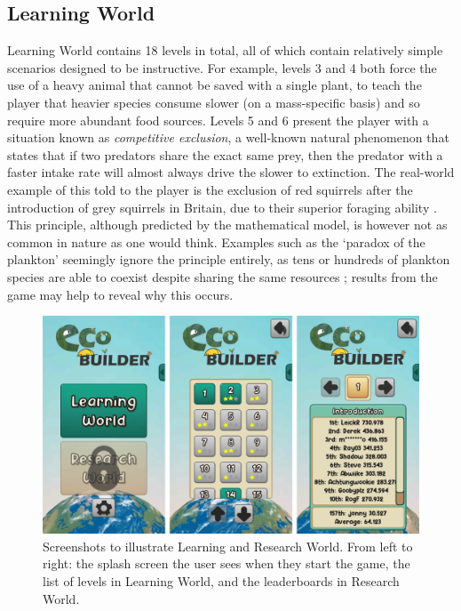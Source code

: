 \subsection{Learning World}
\label{sec:learning_world}
Learning World contains 18 levels in total, all of which contain relatively simple scenarios designed to be instructive. For example, levels 3 and 4 both force the use of a heavy animal that cannot be saved with a single plant, to teach the player that heavier species consume slower (on a mass-specific basis) and so require more abundant food sources. Levels 5 and 6 present the player with a situation known as \emph{competitive exclusion}, a well-known natural phenomenon that states that if two predators share the exact same prey, then the predator with a faster intake rate will almost always drive the slower to extinction.
The real-world example of this told to the player is the exclusion of red squirrels after the introduction of grey squirrels in Britain, due to their superior foraging ability \cite{Gurnell2004}.
This principle, although predicted by the mathematical model, is however not as common in nature as one would think. Examples such as the `paradox of the plankton' seemingly ignore the principle entirely, as tens or hundreds of plankton species are able to coexist despite sharing the same resources \cite{Hutchinson1961}; results from the game may help to reveal why this occurs.

\begin{figure}
    \centering
    \includegraphics[width=\textwidth]{joy/worlds.png}
    \caption[Learning World and Research World]{Screenshots to illustrate Learning and Research World. From left to right: the splash screen the user sees when they start the game, the list of levels in Learning World, and the leaderboards in Research World.}
    \label{fig:eco_worlds}
\end{figure}


